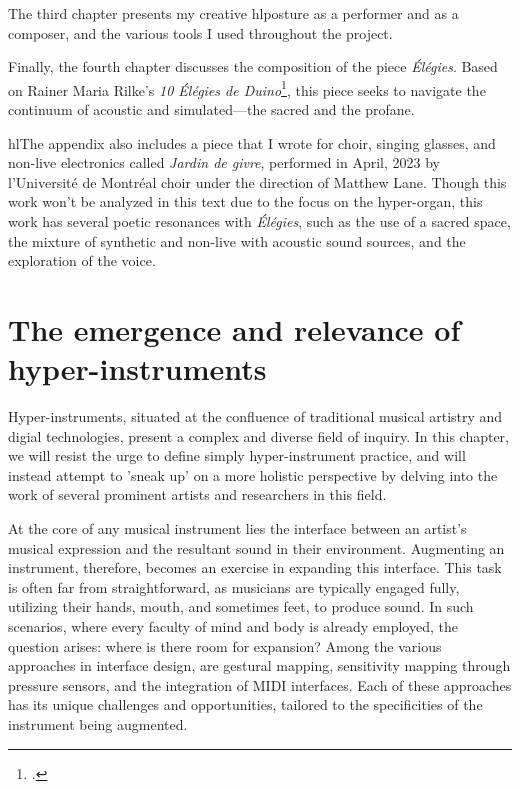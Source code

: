 \documentclass[12pt,twoside,maitrise]{dms_ks}
\theoremstyle{definition}
\begin{document}
The third chapter presents my creative hl{posture} as a performer and as a composer, and the various tools I used throughout the project. 

Finally, the fourth chapter discusses the composition of the piece \textit{Élégies}. 
Based on Rainer Maria Rilke's \textit{10 Élégies de Duino}\footcite{rilke_egies_1986}, this piece seeks to navigate the continuum of acoustic and simulated---the sacred and the profane.

hl{The appendix also includes} a piece that I wrote for choir, singing glasses, and non-live electronics called \textit{Jardin de givre}, performed in April, 2023 by l'Université de Montréal choir under the direction of Matthew Lane. Though this work won't be analyzed in this text due to the focus on the hyper-organ, this work has several poetic resonances with \textit{Élégies}, such as the use of a sacred space, the mixture of synthetic and non-live with acoustic sound sources, and the exploration of the voice.



\chapter{The emergence and relevance of hyper-instruments}

Hyper-instruments, situated at the confluence of traditional musical artistry and digial technologies, present a complex and diverse field of inquiry.
In this chapter, we will resist the urge to define simply hyper-instrument practice, and will instead attempt to 'sneak up' on a more holistic perspective by delving into the work of several prominent artists and researchers in this field.

At the core of any musical instrument lies the interface between an artist's musical expression and the resultant sound in their environment.
Augmenting an instrument, therefore, becomes an exercise in expanding this interface.
This task is often far from straightforward, as musicians are typically engaged fully, utilizing their hands, mouth, and sometimes feet, to produce sound.
In such scenarios, where every faculty of mind and body is already employed, the question arises: where is there room for expansion?
Among the various approaches in interface design, are gestural mapping, sensitivity mapping through pressure sensors, and the integration of MIDI interfaces.
Each of these approaches has its unique challenges and opportunities, tailored to the specificities of the instrument being augmented.
\end{document}
